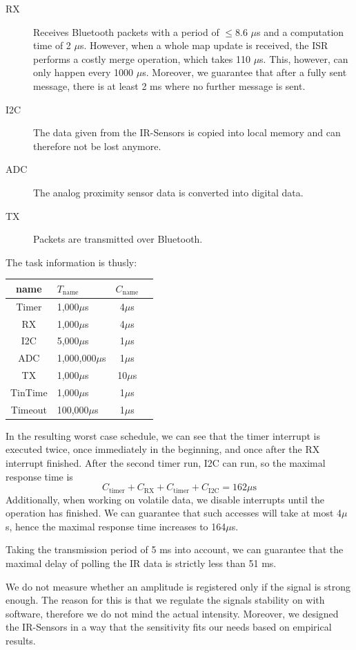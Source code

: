 \documentclass[a4paper,parskip,headheight=38pt]{scrartcl} %
\newcommand{\mics}{$\mu$s}
\begin{document}
{\begin{description}
        \item[RX] Receives Bluetooth packets with a period of $\leq$8.6 \mics
        and a computation time of 2 \mics. However, when a whole map update is
        received, the ISR performs a costly merge operation, which takes 110
        \mics. This, however, can only happen every 1000 \mics. Moreover, we
        guarantee that after a fully sent message, there is at least 2 ms where
        no further message is sent.
        \item[I2C] The data given from the IR-Sensors is copied into local
        memory and can therefore not be lost anymore.
        \item[ADC] The analog proximity sensor data is converted into digital
        data.
        \item[TX] Packets are transmitted over Bluetooth.
    \end{description}
    The task information is thusly:
    \begin{center}
    \begin{tabular}{c | l | c | c}
        name & $T_{\text{name}}$ & $C_\text{name}$ \\
        \hline
        Timer    & 1,000\mics     & 4\mics \\
        RX       & 1,000\mics     & 4\mics \\
        I2C      & 5,000\mics     & 1\mics \\
        ADC      & 1,000,000\mics & 1\mics \\
        TX       & 1,000\mics     & 10\mics \\
        TinTime  & 1,000\mics     & 1\mics \\
        Timeout  & 100,000\mics   & 1\mics \\
    \end{tabular}
    \end{center}
    In the resulting worst case schedule, we can see that the timer interrupt is
    executed twice, once immediately in the beginning, and once after the RX
    interrupt finished. After the second timer run, I2C can run, so the maximal
    response time is 
    \[ C_{\text{timer}} + C_{\text{RX}} + C_{\text{timer}} + C_{\text{I2C}} =
    162  \text{\mics} \]
    Additionally, when working on volatile data, we disable interrupts until the
    operation has finished. We can guarantee that such accesses will take at
    most 4\mics, hence the maximal response time increases to 164\mics.

    Taking the transmission period of 5 ms into account, we can guarantee that
    the maximal delay of polling the IR data is strictly less than 51 ms.
}{
   We do not measure whether an amplitude is registered only if the signal is
   strong enough. The reason for this is that we regulate the signals stability
   on with software, therefore we do not mind the actual intensity. Moreover, we
   designed the IR-Sensors in a way that the sensitivity fits our needs based on
   empirical results.
}
\end{document}
